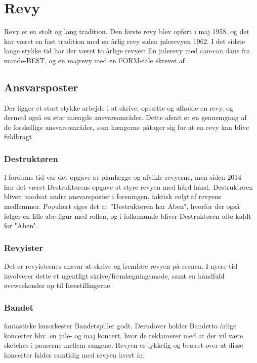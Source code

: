 \chapter{Revy}

\TKETs Revy er en stolt og lang tradition. Den første revy blev opført i maj 1958, og det har været en fast tradition med en årlig revy siden julerevyen 1962. I det sidste lange stykke tid har der været to årlige revyer: En julerevy med can-can dans fra mande-BEST, og en majrevy med en FORM-tale skrevet af \CERM{}.

\section{Ansvarsposter}
Der ligger et stort stykke arbejde i at skrive, opsætte og afholde en revy, og dermed også en stor mængde ansvarsområder. Dette afsnit er en gennemgang af de forskellige ansvarsområder, som hængerne påtager sig for at en \TK revy kan blive fuldbragt.

\subsection{Destruktøren}
I fordums tid var det  opgave at planlægge og afvikle revyerne, men siden 2014 har det været Destruktørens opgave at styre revyen med hård hånd. Destruktøren bliver, modsat andre ansvarsposter i foreningen, faktisk \emph{valgt} af revyens medlemmer. Populært siges det at ''Destruktøren har Aben", hvorfor der også følger en lille abe-figur med rollen, og i folkemunde bliver Destruktøren ofte kaldt for "Aben".

\subsection{Revyister}
Det er revyisternes ansvar at skrive og fremføre revyen på scenen. I nyere tid involverer dette et ugentligt skrive/fremlægningsmøde, samt en håndfuld øveweekender op til forestillingerne.

\subsection{Bandet\texttrademark}
\TKETs fantastiske husorkester Bandet\texttrademark \;spiller godt. Derudover holder Bandet\texttrademark \;to årlige koncerter hhv. en jule- og maj koncert, hvor de reklamerer med at der vil være sketches i pauserne mellem sangene. Revyen er lykkelig og beæret over at disse koncerter falder samtidig med revyen hvert år.

